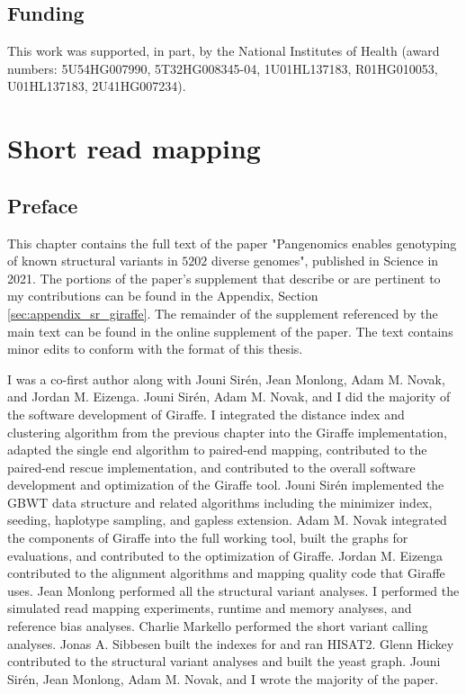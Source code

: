 \documentclass[11pt]{ucscthesis}
\begin{document}
\section{Funding}
This work was supported, in part, by the National Institutes of Health (award numbers: 5U54HG007990, 5T32HG008345-04, 1U01HL137183, R01HG010053, U01HL137183, 2U41HG007234).

\chapter{Short read mapping}
\label{chapter:sr-giraffe}
\section{Preface}
This chapter contains the full text of the paper "Pangenomics enables genotyping of known structural variants in $5202$ diverse genomes"\cite{sr_giraffe_2021}, published in Science in 2021.
The portions of the paper's supplement that describe or are pertinent to my contributions can be found in the Appendix, Section \ref{sec:appendix_sr_giraffe}.
The remainder of the supplement referenced by the main text can be found in the online supplement of the paper.
The text contains minor edits to conform with the format of this thesis.

I was a co-first author along with Jouni Sirén, Jean Monlong, Adam M. Novak, and Jordan M. Eizenga.
Jouni Sirén, Adam M. Novak, and I did the majority of the software development of Giraffe.
I integrated the distance index and clustering algorithm from the previous chapter into the Giraffe implementation, adapted the single end algorithm to paired-end mapping, contributed to the paired-end rescue implementation, and contributed to the overall software development and optimization of the Giraffe tool.
Jouni Sirén implemented the GBWT data structure and related algorithms including the minimizer index, seeding, haplotype sampling, and gapless extension.
Adam M. Novak integrated the components of Giraffe into the full working tool, built the graphs for evaluations, and contributed to the optimization of Giraffe.
Jordan M. Eizenga contributed to the alignment algorithms and mapping quality code that Giraffe uses.
Jean Monlong performed all the structural variant analyses.
I performed the simulated read mapping experiments, runtime and memory analyses, and reference bias analyses. 
Charlie Markello performed the short variant calling analyses.
Jonas A. Sibbesen built the indexes for and ran HISAT2.
Glenn Hickey contributed to the structural variant analyses and built the yeast graph.
Jouni Sirén, Jean Monlong, Adam M. Novak, and I wrote the majority of the paper. 
\end{document}
